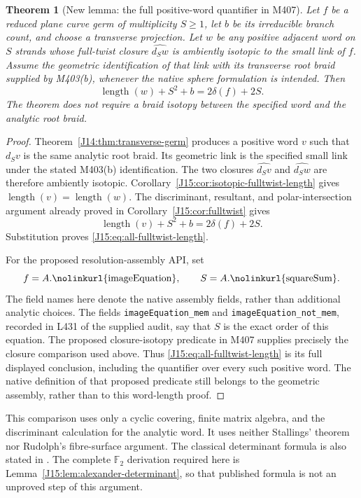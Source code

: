 \documentclass[11pt,oneside]{report}
\newtheorem{theorem}{Theorem}[section]
\theoremstyle{definition}
\numberwithin{equation}{section}
\newcommand{\decl}[1]{\textnormal{\nolinkurl{#1}}}
\newcommand{\length}{\operatorname{length}}
\begin{document}
\begin{theorem}[New lemma: the full positive-word quantifier in M407]
\label{J15:thm:all-fulltwist-words}
Let $f$ be a reduced plane curve germ of multiplicity $S\geq1$,
let $b$ be its irreducible branch count, and choose a transverse
projection. Let $w$ be any positive adjacent word on $S$ strands
whose full-twist closure $\widehat{d_Sw}$ is ambiently isotopic to
the small link of $f$. Assume the geometric identification of that
link with its transverse root braid supplied by M403(b), whenever
the native sphere formulation is intended. Then
\begin{equation}\label{J15:eq:all-fulltwist-length}
 \length(w)+S^2+b=2\delta(f)+2S.
\end{equation}
The theorem does not require a braid isotopy between the specified
word and the analytic root braid.
\end{theorem}
\begin{proof}
Theorem~\ref{J14:thm:transverse-germ} produces a positive
word $v$ such that $d_Sv$ is the same analytic root braid.
Its geometric link is the specified small link under the stated
M403(b) identification. The two closures $\widehat{d_Sv}$ and
$\widehat{d_Sw}$ are therefore ambiently isotopic.
Corollary~\ref{J15:cor:isotopic-fulltwist-length} gives
$\length(v)=\length(w)$.
The discriminant, resultant, and polar-intersection argument already
proved in Corollary~\ref{J15:cor:fulltwist} gives
\[
 \length(v)+S^2+b=2\delta(f)+2S.
\]
Substitution proves \eqref{J15:eq:all-fulltwist-length}.

For the proposed resolution-assembly API, set
\[
 f=A.\decl{imageEquation},\qquad S=A.\decl{squareSum}.
\]
The field names here denote the native assembly fields, rather than
additional analytic choices.
The fields \decl{imageEquation_mem} and
\decl{imageEquation_not_mem}, recorded in L431 of the supplied
audit, say that $S$ is the exact order of this equation.
The proposed closure-isotopy predicate in M407 supplies precisely
the closure comparison used above. Thus
\eqref{J15:eq:all-fulltwist-length} is its full displayed conclusion,
including the quantifier over every such positive word.
The native definition of that proposed predicate still belongs to
the geometric assembly, rather than to this word-length proof.
\end{proof}

This comparison uses only a cyclic covering, finite matrix algebra,
and the discriminant calculation for the analytic word. It uses
neither Stallings' theorem nor Rudolph's fibre-surface argument.
The classical determinant formula is also stated in
\cite[Introduction]{MortonBraid}. The complete $\mathbb F_2$
derivation required here is Lemma~\ref{J15:lem:alexander-determinant},
so that published formula is not an unproved step of this argument.
\end{document}
